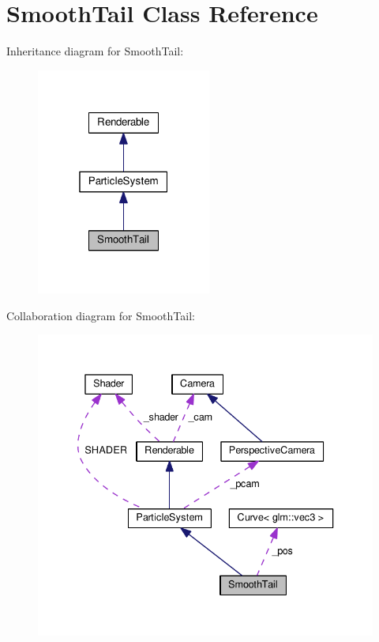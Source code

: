 \hypertarget{class_smooth_tail}{}\section{Smooth\+Tail Class Reference}
\label{class_smooth_tail}


Inheritance diagram for Smooth\+Tail\+:\nopagebreak
\begin{figure}[H]
\begin{center}
\leavevmode
\includegraphics[width=163pt]{class_smooth_tail__inherit__graph}
\end{center}
\end{figure}


Collaboration diagram for Smooth\+Tail\+:\nopagebreak
\begin{figure}[H]
\begin{center}
\leavevmode
\includegraphics[width=336pt]{class_smooth_tail__coll__graph}
\end{center}
\end{figure}
